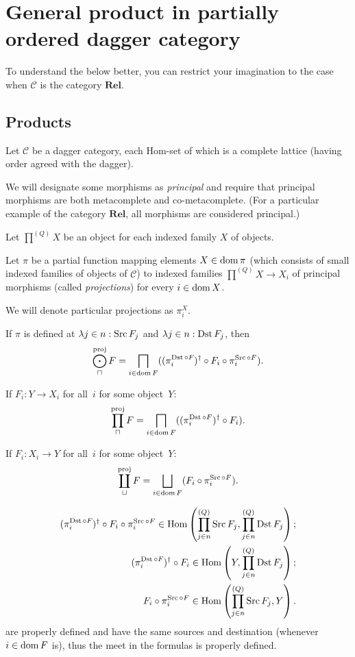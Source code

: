 \section{General product in partially ordered dagger category}

To understand the below better, you can restrict your imagination to the case
when $\mathcal{C}$ is the category $\mathbf{Rel}$.

\subsection{Products}

Let $\mathcal{C}$ be a dagger category, each Hom-set of which is a complete
lattice (having order agreed with the dagger).

We will designate some morphisms as \emph{principal} and require that
principal morphisms are both metacomplete and co-metacomplete. (For a
particular example of the category $\mathbf{Rel}$, all morphisms are
considered principal.)

Let $\prod^{(Q)} X$ be an object for each indexed family $X$ of objects.

Let $\pi$ be a partial function mapping elements $X \in \operatorname{dom} \pi$ (which
consists of small indexed families of objects of $\mathcal{C}$) to indexed
families $\prod^{(Q)} X \rightarrow X_i$ of principal morphisms (called
\emph{projections}) for every $i \in \operatorname{dom} X$.

We will denote particular projections as $\pi^X_i$.

\begin{defn}
  If $\pi$ is defined at $\lambda
  j \in n : \operatorname{Src} F_j$ and $\lambda j \in n : \operatorname{Dst} F_j$, then
  \[ \bigodot^{\text{proj}}_{\sqcap} F = \bigsqcap_{i \in \operatorname{dom} F} ((\pi^{\operatorname{Dst} \circ
   F_{}}_i)^{\dagger} \circ F_i \circ \pi^{\operatorname{Src} \circ F}_i) . \]
\end{defn}

If $F_i:Y\to X_i$ for all~$i$ for some object~$Y$:
\[
  \prod^{\text{proj}}_{\sqcap} F = \bigsqcap_{i \in \operatorname{dom} F} ((\pi^{\operatorname{Dst}\circ F}_i)^{\dagger} \circ F_i) .
\]

If $F_i:X_i\to Y$ for all~$i$ for some object~$Y$:
\[
  \coprod^{\text{proj}}_{\sqcup} F = \bigsqcup_{i \in \dom F} (F_i \circ \pi^{\Src\circ F}_i) .
\]

\begin{rem}
  \begin{align*}
  (\pi^{\operatorname{Dst} \circ
   F_{}}_i)^{\dagger} \circ F_i \circ \pi^{\operatorname{Src} \circ F}_i \in \operatorname{Hom} \left(
  \prod^{(Q)}_{j \in n} \operatorname{Src} F_j , \prod^{(Q)}_{j \in n} \operatorname{Dst} F_j
  \right);\\
  (\pi^{\operatorname{Dst} \circ
   F_{}}_i)^{\dagger} \circ F_i \in \operatorname{Hom} \left(
  Y , \prod^{(Q)}_{j \in n} \operatorname{Dst} F_j
  \right);\\
F_i \circ \pi^{\operatorname{Src} \circ F}_i \in \operatorname{Hom} \left(
  \prod^{(Q)}_{j \in n} \operatorname{Src} F_j , Y \right).
  \end{align*}
  are properly defined and have the same sources and destination
  (whenever $i \in \operatorname{dom} F$ is), thus the meet in the formulas is
  properly defined.
\end{rem}


